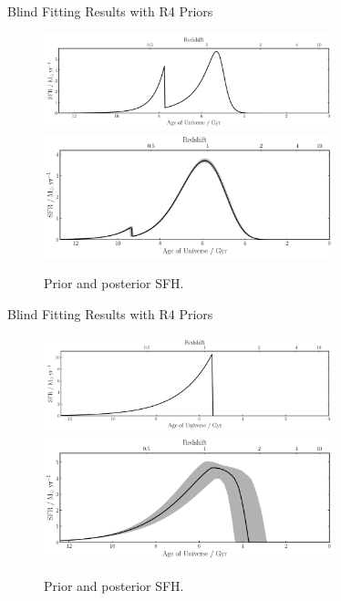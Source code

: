 \documentclass{beamer}
\begin{document}
\begin{frame}{Blind Fitting Results with R4 Priors}
  \begin{figure}
    \centering
    \includegraphics[width=0.75\textwidth]{../pipes/plots/r0_priors/phil_model_9_sfh}
    \includegraphics[width=0.75\textwidth]{../pipes/plots/r4_lognormal_burst/phil_model_9_sfh}
    \caption{Prior and posterior SFH.}
  \end{figure}
\end{frame}

\begin{frame}{Blind Fitting Results with R4 Priors}
  \begin{figure}
    \centering
    \includegraphics[width=0.75\textwidth]{../pipes/plots/r0_priors/phil_model_2_sfh}
    \includegraphics[width=0.75\textwidth]{../pipes/plots/r4_delayed_burst/phil_model_2_sfh}
    \caption{Prior and posterior SFH.}
  \end{figure}
\end{frame}
\end{document}
